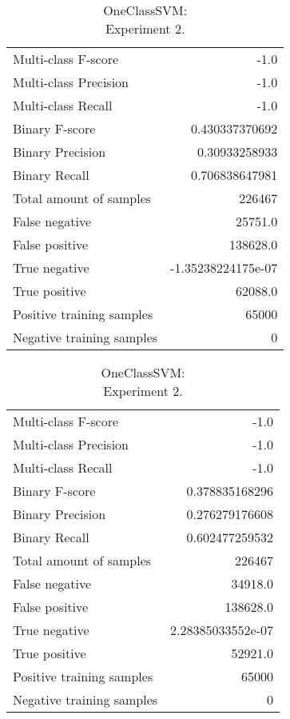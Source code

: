 \begin{table}[H]
\begin{minipage}{0.5\textwidth}

\caption{OneClassSVM: \\Experiment 1.}

\centering
\begin{tabular}{l r}
\toprule
Multi-class F-score & -1.0 \\
Multi-class Precision & -1.0 \\
Multi-class Recall & -1.0 \\
\midrule
Binary F-score & 0.430337370692 \\
Binary Precision & 0.30933258933 \\
Binary Recall & 0.706838647981 \\
\midrule
Total amount of samples & 226467 \\
False negative & 25751.0 \\
False positive & 138628.0 \\
True negative & -1.35238224175e-07 \\
True positive & 62088.0 \\
\midrule
Positive training samples & 65000 \\
Negative training samples & 0 \\
\bottomrule
\end{tabular}

\end{minipage}
\hfillx
\begin{minipage}{0.5\textwidth}
\caption{OneClassSVM: \\Experiment 2.}

\centering
\begin{tabular}{l r}
\toprule
Multi-class F-score & -1.0 \\
Multi-class Precision & -1.0 \\
Multi-class Recall & -1.0 \\
\midrule
Binary F-score & 0.378835168296 \\
Binary Precision & 0.276279176608 \\
Binary Recall & 0.602477259532 \\
\midrule
Total amount of samples & 226467 \\
False negative & 34918.0 \\
False positive & 138628.0 \\
True negative & 2.28385033552e-07 \\
True positive & 52921.0 \\
\midrule
Positive training samples & 65000 \\
Negative training samples & 0 \\
\bottomrule
\end{tabular}
\end{minipage}
\end{table}
